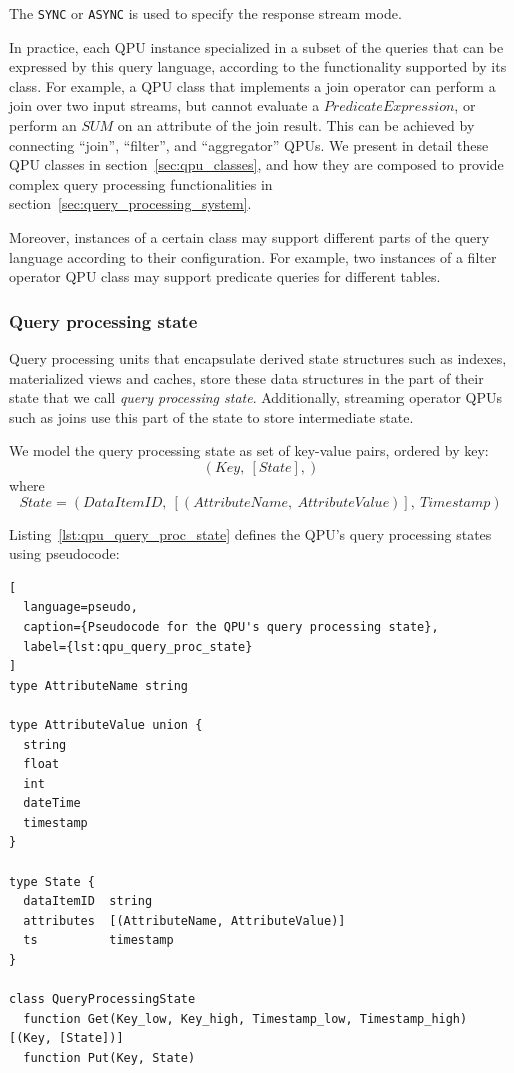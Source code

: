 The \texttt{SYNC} or \texttt{ASYNC} is used to specify the response stream mode.

In practice, each QPU instance specialized in a subset of the queries that can be expressed by this query language,
according to the functionality supported by its class.
For example, a QPU class that implements a join operator can perform a join over two input streams,
but cannot evaluate a $PredicateExpression$, or perform an $SUM$ on an attribute of the join result.
This can be achieved by connecting ``join'', ``filter'', and ``aggregator'' QPUs.
We present in detail these QPU classes in section~\ref{sec:qpu_classes},
and how they are composed to provide complex query processing functionalities in section~\ref{sec:query_processing_system}.

Moreover, instances of a certain class may support different parts of the query language according to their
configuration.
For example, two instances of a filter operator QPU class may support predicate queries for different tables.

\subsubsection{Query processing state}

Query processing units that encapsulate derived state structures such as indexes, materialized views and
caches, store these data structures in the part of their state that we call \textit{query processing state}.
Additionally, streaming operator QPUs such as joins use this part of the state to store intermediate state.

We model the query processing state as set of key-value pairs, ordered by key:
\[
  (Key,~[State],)
\]
where
\[
  State = (DataItemID,~[(AttributeName,~AttributeValue)],~Timestamp)
\]


Listing~\ref{lst:qpu_query_proc_state} defines the QPU's query processing states using pseudocode:

\begin{lstlisting}[
  language=pseudo,
  caption={Pseudocode for the QPU's query processing state},
  label={lst:qpu_query_proc_state}
]
type AttributeName string

type AttributeValue union {
  string
  float
  int
  dateTime
  timestamp
}

type State {
  dataItemID  string
  attributes  [(AttributeName, AttributeValue)]
  ts          timestamp
}

class QueryProcessingState
  function Get(Key_low, Key_high, Timestamp_low, Timestamp_high) [(Key, [State])]
  function Put(Key, State)
\end{lstlisting}

